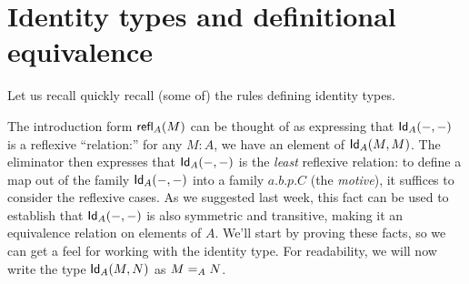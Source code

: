 \documentclass{article}
\begin{document}
\section{Identity types and definitional equivalence}

Let us recall quickly recall (some of) the rules defining identity types.

The introduction form $\refl[A]{M}$ can be thought of as expressing that
$\Id{A}{-}{-}$ is a reflexive ``relation:'' for any $M:A$, we have an element of
$\Id{A}{M}{M}$. The eliminator then expresses that $\Id{A}{-}{-}$ is the
\emph{least} reflexive relation: to define a map out of the family
$\Id{A}{-}{-}$ into a family $a.b.p.C$ (the \emph{motive}), it suffices to
consider the reflexive cases. As we suggested last week, this fact can be used
to establish that $\Id{A}{-}{-}$ is also symmetric and transitive, making it an
equivalence relation on elements of $A$. We'll start by proving these facts, so
we can get a feel for working with the identity type. For readability, we will
now write the type $\Id{A}{M}{N}$ as $\Ideq{A}{M}{N}$.
\end{document}
